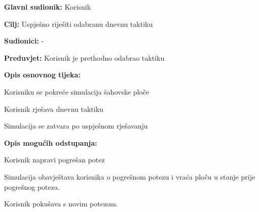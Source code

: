 					\noindent {}
					\begin{packed_item}
	
						\item \textbf{Glavni sudionik: }Korisnik
						\item  \textbf{Cilj: } Uspješno riješiti odabranu dnevnu taktiku
						\item  \textbf{Sudionici: }-
						\item  \textbf{Preduvjet: }Korisnik je prethodno odabrao taktiku
						\item  \textbf{Opis osnovnog tijeka:}
						
						\item[] \begin{packed_enum}
	
							\item Korisniku se pokreće simulacija šahovske ploče
							\item Korisnik rješava dnevnu taktiku
							\item Simulacija se zatvara po uspješnom rješavanju
							
						\end{packed_enum}
						
						\item  \textbf{Opis mogućih odstupanja:}
						
						\item[] \begin{packed_item}
	
							\item[2.a] Korisnik napravi pogrešan potez
							\item[] \begin{packed_enum}
								
								\item Simulacija obavještava korisnika o pogrešnom potezu i vraća ploču u stanje prije pogrešnog poteza.
								\item Korisnik pokušava s novim potezom.
								
							\end{packed_enum}
							
						\end{packed_item}
					\end{packed_item}



